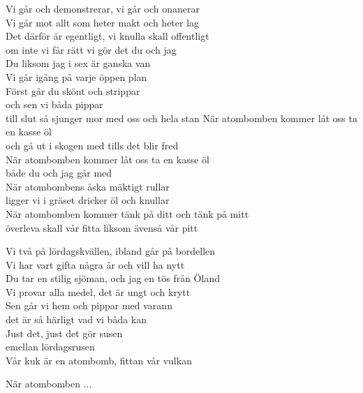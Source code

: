 \vspace{10pt}
Vi går och demonstrerar, vi går och onanerar\\
Vi går mot allt som heter makt och heter lag\\
Det därför är egentligt, vi knulla skall offentligt\\
om inte vi får rätt vi gör det du och jag\\
Du liksom jag i sex är ganska van\\
Vi går igång på varje öppen plan\\
Först går du skönt och strippar\\
och sen vi båda pippar\\
till slut så sjunger mor med oss och hela stan
\newpage
När atombomben kommer låt oss ta en kasse öl\\
och gå ut i skogen med tills det blir fred\\
När atombomben kommer låt oss ta en kasse öl\\
både du och jag går med\\
När atombombens åska mäktigt rullar\\
ligger vi i gräset dricker öl och knullar\\
När atombomben kommer tänk på ditt och tänk på mitt\\
överleva skall vår fitta liksom ävenså vår pitt\par
\vspace{10pt}
Vi två på lördagskvällen, ibland går på bordellen\\
Vi har vart gifta några år och vill ha nytt\\
Du tar en stilig sjöman, och jag en tös från Öland\\
Vi provar alla medel, det är ungt och krytt\\
Sen går vi hem och pippar med varann\\
det är så härligt vad vi båda kan\\
Just det, just det gör susen\\
emellan lördagsrusen\\
Vår kuk är en atombomb, fittan vår vulkan\par
\vspace{10pt}
När atombomben ...
